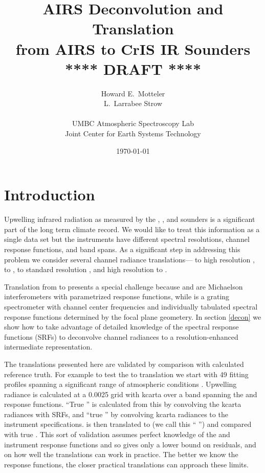 \documentclass[12pt]{article}
\title{AIRS Deconvolution and Translation \\
  from AIRS to CrIS IR Sounders \\
  \vspace{3mm}
  {****} DRAFT {****}\\
}
\author{Howard E.~Motteler \\
  L.~Larrabee Strow \\
  \\
  UMBC Atmospheric Spectroscopy Lab \\
  Joint Center for Earth Systems Technology \\
}
\date{\today}
\begin{document}
\maketitle

\section{Introduction}

Upwelling infrared radiation as measured by the {\airs}
\cite{airs1}, {\iasi} \cite{iasi1}, and {\cris} \cite{cris1,cris2}
sounders is a significant part of the long term climate record.  We
would like to treat this information as a single data set but the
instruments have different spectral resolutions, channel response
functions, and band spans.  As a significant step in addressing this
problem we consider several channel radiance translations---{\iasi}
to high resolution {\cris}, {\iasi} to {\airs}, {\airs} to standard
resolution {\cris}, and high resolution {\cris} to {\airs}.

Translation from {\airs} to {\cris} presents a special challenge
because {\cris} and {\iasi} are Michaelson interferometers with
parametrized response functions, while {\airs} is a grating
spectrometer with channel center frequencies and individually
tabulated spectral response functions determined by the focal plane
geometery.  In section \ref{decon} we show how to take advantage of
detailed knowledge of the {\airs} spectral response functions (SRFs)
to deconvolve {\airs} channel radiances to a resolution-enhanced
intermediate representation.

The translations presented here are validated by comparison with
calculated reference truth.  For example to test the {\iasi} to
{\airs} translation we start with 49 fitting profiles spanning a
significant range of atmospheric conditions \cite{sarta1,sarta2}.
Upwelling radiance is calculated at a 0.0025 {\wn} grid with kcarta
\cite{kcarta1} over a band spanning the {\airs} and {\iasi} response
functions.  ``True {\airs}'' is calculated from this by convolving
the kcarta radiances with {\airs} SRFs, and ``true {\iasi}'' by
convolving kcarta radiances to the {\iasi} instrument
specifications.  {\iasi} is then translated to {\airs} (we call this
``{\iasi} {\airs}'') and compared with true {\airs}.  This sort of
validation assumes perfect knowledge of the {\airs} and {\iasi}
instrument response functions and so gives only a lower bound on
residuals, and on how well the translations can work in practice.
The better we know the response functions, the closer practical
translations can approach these limits.
\end{document}
